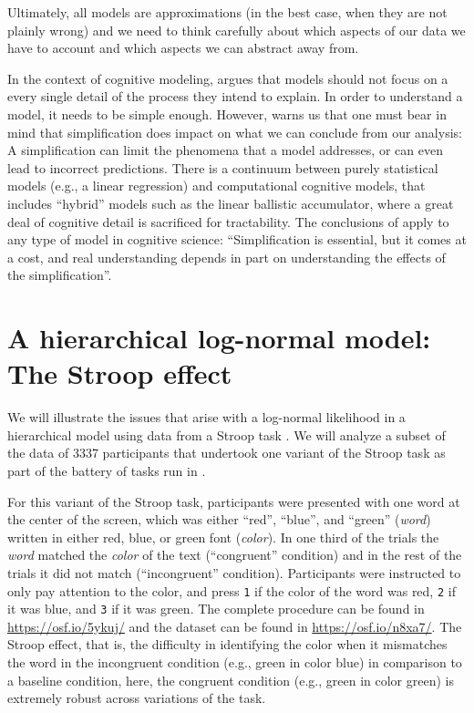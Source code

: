 \documentclass[12pt,]{krantz}
\theoremstyle{definition}
\theoremstyle{definition}
\theoremstyle{definition}
\theoremstyle{remark}
\begin{document}
Ultimately, all models are approximations (in the best case, when they
are not plainly wrong) and we need to think carefully about which
aspects of our data we have to account and which aspects we can abstract
away from.

In the context of cognitive modeling,
\citet{mcclellandPlaceModelingCognitive2009} argues that models should
not focus on a every single detail of the process they intend to
explain. In order to understand a model, it needs to be simple enough.
However, \citet{mcclellandPlaceModelingCognitive2009} warns us that one
must bear in mind that simplification does impact on what we can
conclude from our analysis: A simplification can limit the phenomena
that a model addresses, or can even lead to incorrect predictions. There
is a continuum between purely statistical models (e.g., a linear
regression) and computational cognitive models, that includes ``hybrid''
models such as the linear ballistic accumulator, where a great deal of
cognitive detail is sacrificed for tractability. The conclusions of
\citet{mcclellandPlaceModelingCognitive2009} apply to any type of model
in cognitive science: ``Simplification is essential, but it comes at a
cost, and real understanding depends in part on understanding the
effects of the simplification''.

\section{A hierarchical log-normal model: The Stroop
effect}\label{sec:stroop}

We will illustrate the issues that arise with a log-normal likelihood in
a hierarchical model using data from a Stroop task
\citetext{\citealp{stroop1935studies}; \citealp[for a review,
see][]{macleod1991half}}. We will analyze a subset of the data of 3337
participants that undertook one variant of the Stroop task as part of
the battery of tasks run in \citet{ManyLabs3}.

For this variant of the Stroop task, participants were presented with
one word at the center of the screen, which was either ``red'',
``blue'', and ``green'' (\emph{word}) written in either red, blue, or
green font (\emph{color}). In one third of the trials the \emph{word}
matched the \emph{color} of the text (``congruent'' condition) and in
the rest of the trials it did not match (``incongruent'' condition).
Participants were instructed to only pay attention to the color, and
press \texttt{1} if the color of the word was red, \texttt{2} if it was
blue, and \texttt{3} if it was green. The complete procedure can be
found in \url{https://osf.io/5ykuj/} and the dataset can be found in
\url{https://osf.io/n8xa7/}. The Stroop effect, that is, the difficulty
in identifying the color when it mismatches the word in the incongruent
condition (e.g., green in color blue) in comparison to a baseline
condition, here, the congruent condition (e.g., green in color green) is
extremely robust across variations of the task.
\end{document}
